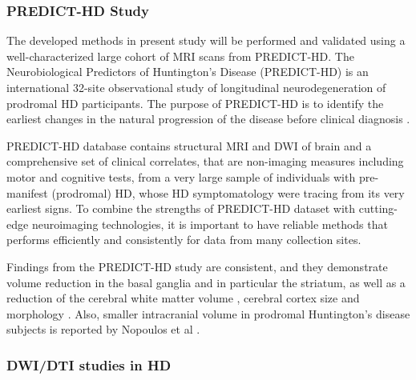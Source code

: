 \subsubsection{PREDICT-HD Study}

\noindent The developed methods in present study will be performed and validated using a well-characterized large cohort of MRI scans from PREDICT-HD. The Neurobiological Predictors of Huntington’s Disease (PREDICT-HD) is an international 32-site observational study of longitudinal neurodegeneration of prodromal HD participants. The purpose of PREDICT-HD is to identify the earliest changes in the natural progression of the disease before clinical diagnosis \cite{PREDICTHD}. 
\newline

\noindent PREDICT-HD database contains structural MRI and DWI of brain and a comprehensive set of clinical correlates, that are non-imaging measures including motor and cognitive tests, from a very large sample of individuals with pre-manifest (prodromal) HD, whose HD symptomatology were tracing from its very earliest signs. To combine the strengths of PREDICT-HD dataset with cutting-edge neuroimaging technologies, it is important to have reliable methods that performs efficiently and consistently for data from many collection sites.
\newline

\noindent Findings from the PREDICT-HD study are consistent, and they demonstrate volume reduction in the basal ganglia and in particular the striatum, as well as a reduction of the cerebral white matter volume \cite{Paulsen2008a, Rosas2001}, cerebral cortex size \cite{Paulsen2006} and morphology \cite{Nopoulos2010}. Also, smaller intracranial volume in prodromal Huntington’s disease subjects is reported by Nopoulos et al \cite{Nopoulos2011co}.
\newline

\subsubsection{DWI/DTI studies in HD}

